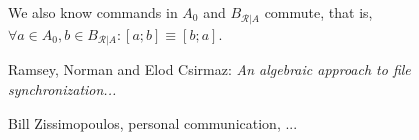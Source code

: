 \documentclass[12pt]{article}
\newcommand{\recchar}[3]{{#1}^{#3}_{\mathcal{R}|{#2}}}
\newcommand{\recb}{\recchar{B}{A}{}}
\theoremstyle{definition}
\begin{document}
We also know commands in $A_0$ and $\recb$ commute, that is,
$\forall a\in A_0, b\in\recb: [a;b]\equiv[b;a]$.



\begin{thebibliography}{99}

 Ramsey, Norman and Elod Csirmaz: {\it An algebraic approach to
file synchronization...}

 Bill Zissimopoulos, personal communication, ...

\end{thebibliography}
\end{document}

